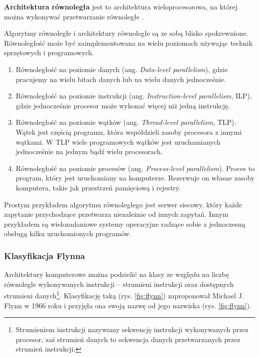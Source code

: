 \begin{definicja}\label{def:arch_rownolegla}
\textbf{Architektura równoległa} jest to architektura wieloprocesorowa, na której można wykonywać przetwarzanie równoległe \cite{IEEE}.
\end{definicja}

Algorytmy równoległe i architektury równoległe są ze sobą blisko spokrewnione. Równoległość może być zaimplementowana na wielu poziomach używając technik sprzętowych i programowych.
\begin{enumerate}
\item{Równoległość na poziomie danych (ang. \emph{Data-level parallelism}), gdzie pracujemy na wielu bitach danych lub na wielu danych jednocześnie.}
\item{Równoległość na poziomie instrukcji (ang. \emph{Instruction-level parallelism}, ILP), gdzie jednocześnie procesor może wykonać więcej niż jedną instrukcję.}
\item{Równoległość na poziomie wątków (ang. \emph{Thread-level parallelism}, TLP). Wątek jest częścią programu, która współdzieli zasoby procesora z innymi wątkami. W TLP wiele programowych wątków jest uruchamianych jednocześnie na jednym bądź wielu procesorach.}
\item{Równoległość na poziomie procesów (ang. \emph{Process-level parallelism}). Proces to program, który jest uruchomiany na komputerze. Rezerwuje on własne zasoby komputera, takie jak przestrzeń pamięciową i rejestry.\cite{APC2011}}
\end{enumerate}

\begin{przyklad}
Prostym przykładem algorytmu równoległego jest serwer siecowy, który każde zapytanie przychodzące przetwarza niezależnie od innych zapytań. Innym przykładem są wielozadaniowe systemy operacyjne radzące sobie z jednoczesną obsługą kilku uruchomionych programów.
\end{przyklad}

\subsubsection{Klasyfikacja Flynna}
Architektury komputerowe można podzielić na klasy ze względu na liczbę równolegle wykonywanych instrukcji -- strumieni instrukcji oraz dostępnych strumieni danych\footnote{Strumieniem instrukcji nazywamy sekwencję instrukcji wykonywanych przez procesor, zaś strumień danych to sekwencja danych przetwarzanych przez strumień instrukcji.}. 
Klasyfikację taką (rys. \ref{fig:flynn}) zaproponował Michael J. Flynn w 1966 roku i przyjęła ona swoją nazwę od jego nazwiska (rys. \ref{fig:flynn}).

